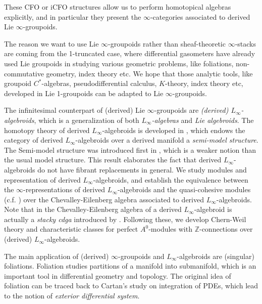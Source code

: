 \documentclass[12pt]{amsart}
\theoremstyle{definition}
\theoremstyle{remark}
\numberwithin{equation}{section}
\newcommand{\Z}{{\mathbb{Z}}}
\newcommand{\1}{{\mathbb{1}}}
\newcommand{\li}{L_{\infty}}
\begin{document}
These CFO or iCFO structures allow us to perform homotopical algebras explicitly, and in particular they present the $\infty$-categories associated to derived Lie $\infty$-groupoids. 



The reason we want to use Lie $\infty$-groupoids rather than sheaf-theoretic $\infty$-stacks are coming from the 1-truncated case, where differential gasometers have already used Lie groupoids in studying various geometric problems, like foliations, non-commutative geometry, index theory etc. We hope that those analytic tools, like groupoid $C^*$-algebras, pseudodifferential calculus, $K$-theory, index theory etc, developed in Lie 1-groupoids can be adapted to Lie $\infty$-groupoids. 


The infinitesimal counterpart of (derived) Lie $\infty$-groupoids are {\it (derived) $L_{\infty}$-algebroids}, which is a generalization of both {\it $L_{\infty}$-algebras} and {\it Lie algebroids}. The homotopy theory of derived $L_{\infty}$-algebroids is developed in \cite{Nui18}, which endows the category of derived $L_{\infty}$-algebroids over a derived manifold a {\it semi-model structure}. The Semi-model structure was introduced first in \cite{Hov98}, which is a  weaker notion than the usual model structure. This result elaborates the fact that derived $L_{\infty}$-algebroids do not have fibrant replacements in general. We study modules and representation of derived $L_{\infty}$-algebroids, and establish the equivalence between the $\infty$-representations of derived $L_{\infty}$-algebroids and the quasi-cohesive modules (c.f. \cite{Blo05}\cite{BD10}) over the Chevalley-Eilenberg algebra associated to derived $L_{\infty}$-algebroids. Note that in the Chevalley-Eilenberg algebra of a derived $L_{\infty}$-algebroid is actually a {\it stacky cdga} introduced by \cite{Pri17}. Following these, we develop Chern-Weil theory and characteristic classes for perfect $A^0$-modules with $\Z$-connections over (derived) $L_{\infty}$-algebroids. 

The main application of (derived) $\infty$-groupoids and $\li$-algebroids are (singular) foliations. Foliation studies partitions of a manifold into submanifold, which is an important tool in differential geometry and topology. The original idea of foliation can be traced back to Cartan's study on integration of PDEs, which lead to the notion of {\it exterior differential system}. 
\end{document}
